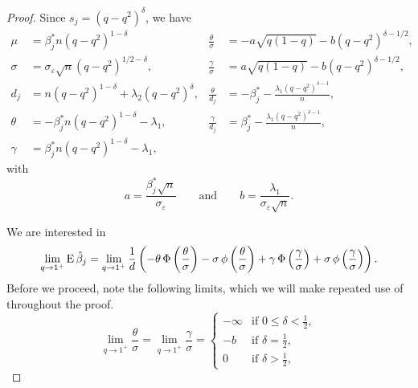 \begin{proof}

  Since \(s_j = (q - q^2)^\delta\), we have
  \begin{align*}
    \mu    & = \beta_j^* n (q - q^2)^{1 - \delta}                     & \frac{\theta}{\sigma} & = -a \sqrt{q(1-q)} - b (q - q^2)^{\delta - 1/2},           \\
    \sigma & = \sigma_\varepsilon \sqrt{n} (q - q^2)^{1/2 - \delta},  & \frac{\gamma}{\sigma} & = a \sqrt{q(1-q)} - b (q - q^2)^{\delta - 1/2},            \\
    d_j    & = n (q - q^2)^{1 - \delta} + \lambda_2 (q - q^2)^\delta, & \frac{\theta}{d_j}    & = -\beta_j^* - \frac{\lambda_1 (q - q^2)^{\delta - 1}}{n}, \\
    \theta & = -\beta^*_j n (q - q^2)^{1-\delta} - \lambda_1,         & \frac{\gamma}{d_j}    & = \beta_j^* - \frac{\lambda_1 (q - q^2)^{\delta - 1}}{n},  \\
    \gamma & = \beta^*_j n (q - q^2)^{1-\delta} - \lambda_1,
  \end{align*}
  with
  \[
    a = \frac{\beta_j^* \sqrt{n}}{\sigma_\varepsilon} \qquad \text{and} \qquad b = \frac{\lambda_1}{\sigma_\varepsilon \sqrt{n}}.
  \]

  We are interested in
  \begin{equation}
    \label{eq:eval-qlimit}
    \lim_{q \rightarrow 1^+} \operatorname{E} \hat{\beta}_j =\lim_{q \rightarrow 1^+}\frac{1}{d}\left(-\theta \operatorname{\Phi}\left(\frac{\theta}{\sigma}\right) - \sigma \operatorname{\phi}\left(\frac{\theta}{\sigma}\right) + \gamma \operatorname{\Phi}\left(\frac{\gamma}{\sigma}\right) + \sigma \operatorname{\phi}\left(\frac{\gamma}{\sigma}\right)\right).
  \end{equation}
  Before we proceed, note the following limits, which we will make repeated use of throughout the proof.
  \begin{equation}
    \label{eq:eval-sigma-limits}
    \lim_{q \rightarrow 1^+} \frac{\theta}{\sigma} = \lim_{q \rightarrow 1^+} \frac{\gamma}{\sigma} =
    \begin{cases}
      -\infty & \text{if } 0 \leq \delta < \frac{1}{2}, \\
      -b      & \text{if } \delta = \frac{1}{2},        \\
      0       & \text{if } \delta > \frac{1}{2},
    \end{cases}
  \end{equation}


\end{proof}

